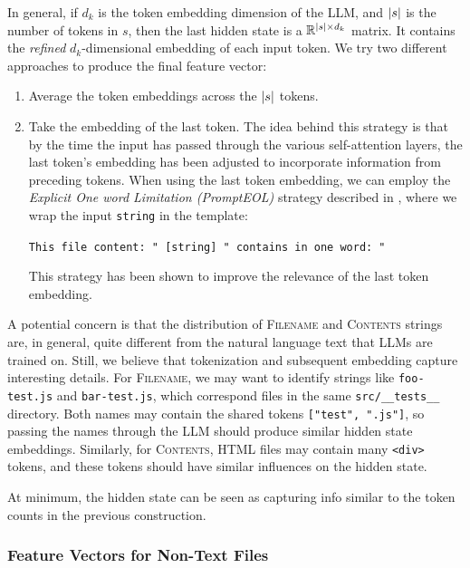 \documentclass{article}
\begin{document}
In general, if $d_k$ is the token embedding dimension of the LLM, and $\abs{s}$ is the number of tokens in $s$, then the last hidden state is a $\mathbb R^{\abs{s} \times d_k}$ matrix. It contains the \emph{refined} $d_k$-dimensional embedding of each input token. We try two different approaches to produce the final feature vector:
\begin{enumerate}
  \item Average the token embeddings across the $\abs{s}$ tokens.
  \item Take the embedding of the last token. The idea behind this strategy is that by the time the input has passed through the various self-attention layers, the last token's embedding has been adjusted to incorporate information from preceding tokens. When using the last token embedding, we can employ the \emph{Explicit One word Limitation (PromptEOL)} strategy described in \cite{jiang2023scalingsentenceembeddingslarge}, where we wrap the input \texttt{string} in the template:
        \begin{center}
          \texttt{This file content: " [string] " contains in one word: "}
        \end{center}
        This strategy has been shown to improve the relevance of the last token embedding.
\end{enumerate}

A potential concern is that the distribution of \textsc{Filename} and \textsc{Contents} strings are, in general, quite different from the natural language text that LLMs are trained on. Still, we believe that tokenization and subsequent embedding capture interesting details. For \textsc{Filename}, we may want to identify strings like \texttt{foo-test.js} and \texttt{bar-test.js}, which correspond files in the same \texttt{src/\_\_tests\_\_} directory. Both names may contain the shared tokens \texttt{["test", ".js"]}, so passing the names through the LLM should produce similar hidden state embeddings. Similarly, for \textsc{Contents}, HTML files may contain many \texttt{<div>} tokens, and these tokens should have similar influences on the hidden state.

At minimum, the hidden state can be seen as capturing info similar to the token counts in the previous construction.

\subsubsection{Feature Vectors for Non-Text Files}
\end{document}
